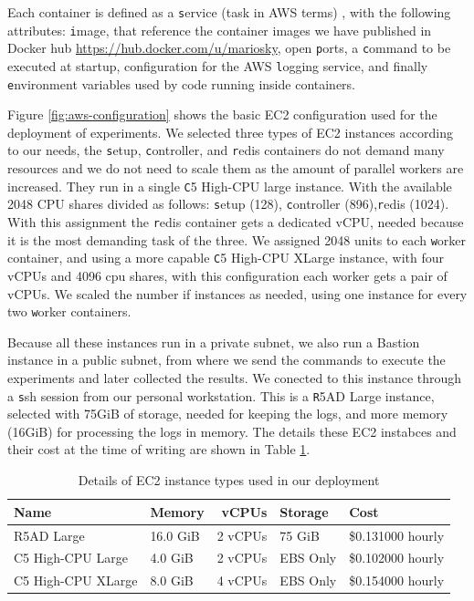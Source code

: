 \documentclass[review]{elsarticle}
\begin{document}
Each container is defined as a {\texttt service} (task in AWS terms) , with the following attributes: {\texttt image},
that reference the container images we have published in Docker hub
\url{https://hub.docker.com/u/mariosky}, open {\texttt ports}, a {\texttt command} to be executed at
startup, configuration for the AWS {\texttt logging} service, and finally {\texttt environment}
variables used by code running inside containers.

Figure \ref{fig:aws-configuration} shows the basic EC2 configuration used for the deployment
of experiments. We selected three types of EC2 instances according to our needs, the  
{\texttt setup}, {\texttt controller}, and {\texttt redis} containers do not demand many resources
and we do not need to scale them as the amount of parallel workers are increased. They run in a
single {\texttt C5  High-CPU large} instance. With the available 2048 CPU shares divided as follows:
{\texttt setup} (128),  {\texttt controller} (896),{\texttt redis} (1024). With this assignment 
the {\texttt redis} container gets a dedicated vCPU, needed because it is the most demanding 
task of the three. We assigned 2048 units to each {\texttt worker} container, and using a more 
capable {\texttt C5 High-CPU XLarge} instance,  with 
four vCPUs and 4096 cpu shares, with this configuration each worker gets a pair of vCPUs.  
We scaled the number if instances as needed, using one instance for every two {\texttt worker} containers. 

Because all these instances run in a private subnet, we also
run a Bastion instance in a public subnet, from where we send the commands to execute the experiments 
and later collected the results. We conected to this instance through a {\texttt ssh} session from 
our personal workstation. This is a {\texttt R5AD Large} instance, selected with 75GiB of storage, needed for
keeping the logs, and more memory (16GiB) for processing the logs in memory. The details these EC2 instabces 
and their cost at the time of writing are shown in Table \ref{tab:ec2}.       


\begin{table}[h!tbp]
  \small
  \caption{Details of EC2 instance types used in our deployment}
  \label{tab:ec2} 
  \centering
  \small
  \begin{tabular}{|l|l|r|l|l|}
    \hline
    Name & Memory & vCPUs & Storage  & Cost \\ \hline
    R5AD Large	&	16.0 GiB	& 2 vCPUs	& 75 GiB 	& \$0.131000 hourly \\ \hline
    C5 High-CPU Large	&	4.0 GiB	& 2 vCPUs	& EBS Only 	& \$0.102000 hourly \\ \hline
    C5 High-CPU XLarge	&	8.0 GiB	& 4 vCPUs	& EBS Only 	& \$0.154000 hourly \\ \hline
  \end{tabular}
\end{table}
\end{document}
